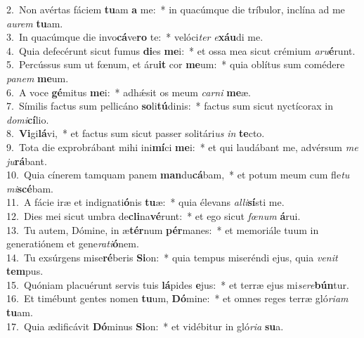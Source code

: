 {2.~}Non avértas fáciem \textbf{tu}am \textbf{a} me:~* in quacúmque die tríbulor, inclína ad me \textit{au}\textit{rem} \textbf{tu}am.\\
{3.~}In quacúmque die invo\textbf{cá}ve\textbf{ro} te:~* velóci\textit{ter} \textit{e}\textbf{xáu}di me.\\
{4.~}Quia defecérunt sicut fumus \textbf{di}es \textbf{me}i:~* et ossa mea sicut crémium \textit{a}\textit{ru}\textbf{é}runt.\\
{5.~}Percússus sum ut fœnum, et áru\textbf{it} cor \textbf{me}um:~* quia oblítus sum comédere \textit{pa}\textit{nem} \textbf{me}um.\\
{6.~}A voce \textbf{gé}mitus \textbf{me}i:~* adhǽsit os meum \textit{car}\textit{ni} \textbf{me}æ.\\
{7.~}Símilis factus sum pellicáno \textbf{so}li\textbf{tú}dinis:~* factus sum sicut nyctícorax in \textit{do}\textit{mi}\textbf{cí}lio.\\
{8.~}\textbf{Vi}gi\textbf{lá}vi,~* et factus sum sicut passer solitári\textit{us} \textit{in} \textbf{te}cto.\\
{9.~}Tota die exprobrábant mihi ini\textbf{mí}ci \textbf{me}i:~* et qui laudábant me, advérsum \textit{me} \textit{ju}\textbf{rá}bant.\\
{10.~}Quia cínerem tamquam panem \textbf{man}du\textbf{cá}bam,~* et potum meum cum fle\textit{tu} \textit{mi}\textbf{scé}bam.\\
{11.~}A fácie iræ et indignati\textbf{ó}nis \textbf{tu}æ:~* quia élevans \textit{al}\textit{li}\textbf{sí}sti me.\\
{12.~}Dies mei sicut umbra de\textbf{cli}na\textbf{vé}runt:~* et ego sicut \textit{fœ}\textit{num} \textbf{á}rui.\\
{13.~}Tu autem, Dómine, in æ\textbf{tér}num \textbf{pér}manes:~* et memoriále tuum in generatiónem et gene\textit{ra}\textit{ti}\textbf{ó}nem.\\
{14.~}Tu exsúrgens mise\textbf{ré}beris \textbf{Si}on:~* quia tempus miseréndi ejus, quia \textit{ve}\textit{nit} \textbf{tem}pus.\\
{15.~}Quóniam placuérunt servis tuis \textbf{lá}pides \textbf{e}jus:~* et terræ ejus mi\textit{se}\textit{re}\textbf{bún}tur.\\
{16.~}Et timébunt gentes nomen \textbf{tu}um, \textbf{Dó}mine:~* et omnes reges terræ gló\textit{ri}\textit{am} \textbf{tu}am.\\
{17.~}Quia ædificávit \textbf{Dó}minus \textbf{Si}on:~* et vidébitur in gló\textit{ri}\textit{a} \textbf{su}a.\\
